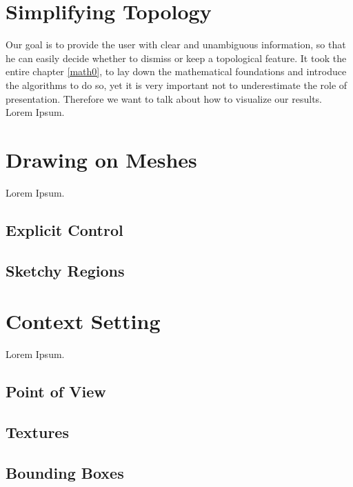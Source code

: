 \section{Simplifying Topology}
\label{topstoc2}

Our goal is to provide the user with clear and unambiguous information, so that he can easily decide whether to dismiss or keep a topological feature.
It took the entire chapter \ref{math0}, to lay down the mathematical foundations and introduce the algorithms to do so, yet it is very important not to underestimate the role of presentation.
Therefore we want to talk about how to visualize our results.\\
Lorem Ipsum.


\section{Drawing on Meshes}
\label{topstoc3}

Lorem Ipsum.

\subsection{Explicit Control}
\label{topstoc31}

\subsection{Sketchy Regions}
\label{topstoc32}


\section{Context Setting}
\label{topstoc4}

Lorem Ipsum.

\subsection{Point of View}
\label{topstoc41}

\subsection{Textures}
\label{topstoc42}

\subsection{Bounding Boxes}
\label{topstoc43}

